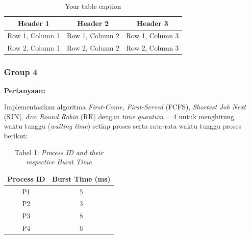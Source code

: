 \documentclass[12pt]{article}
\begin{document}
        \begin{table}[htbp] %
            \centering
            \begin{tabular}{|c|c|c|} %
            \hline
            Header 1 & Header 2 & Header 3 \\ %
            \hline
            Row 1, Column 1 & Row 1, Column 2 & Row 1, Column 3 \\ %
            \hline
            Row 2, Column 1 & Row 2, Column 2 & Row 2, Column 3 \\ %
            \hline
            \end{tabular}
            \caption{Your table caption} %
            \label{tab:your_label} %
        \end{table}

        \subsubsection{Group 4}
        \textbf{Pertanyaan: }

        Implementasikan algoritma \textit{First-Come, First-Served} (FCFS), \textit{Shortest Job Next} (SJN), dan \textit{Round Robin} (RR) dengan \textit{time quantum} = 4 untuk menghitung waktu tunggu (\textit{waiting time}) setiap proses serta rata-rata waktu tunggu proses berikut:
        \begin{table}[htbp] %
            \centering
            \begin{tabular}{|c|c|} %
            \hline
            \textbf{Process ID} & \textbf{Burst Time (ms)} \\ 
            \hline
            P1 & 5 \\ 
            \hline
            P2 & 3 \\
            \hline
            P3 & 8 \\
            \hline
            P4 & 6 \\ 
            \hline
            \end{tabular}
                        \caption{Tabel 1: \textit{Process ID and their respective Burst Time}}
            \label{tab:process_burst_time} 
        \end{table}
\end{document}
